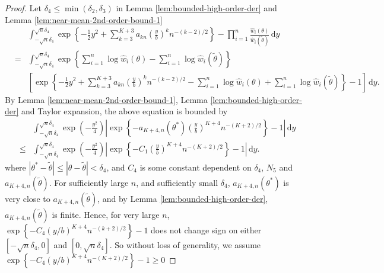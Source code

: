 \documentclass[oneside,english]{amsbook}
\numberwithin{section}{chapter}
\numberwithin{equation}{section}
\numberwithin{figure}{section}
\theoremstyle{plain}
\theoremstyle{plain}
\theoremstyle{definition}
\theoremstyle{plain}
\theoremstyle{plain}
\theoremstyle{remark}
\theoremstyle{definition}
\theoremstyle{definition}
\newcommand{\diff}{\,\mathrm{d}}
\begin{document}
\begin{proof}
Let $\delta_{4}\le\min\left(\delta_{2},\delta_{3}\right)$ in Lemma
\ref{lem:bounded-high-order-der} and Lemma \ref{lem:near-mean-2nd-order-bound-1}
\begin{eqnarray*}
 &  & \int_{-\sqrt{n}\delta_{4}}^{\sqrt{n}\delta_{4}}\exp\left\{ -\frac{1}{2}y^{2}+\sum_{k=3}^{K+3}a_{kn}\left(\frac{y}{b}\right)^{k}n^{-\left(k-2\right)/2}\right\} -\prod_{i=1}^{n}\frac{\hat{w}_{i}\left(\theta\right)}{\hat{w}_{i}\left(\tilde{\theta}\right)}\diff y\\
 & = & \int_{-\sqrt{n}\delta_{4}}^{\sqrt{n}\delta_{4}}\exp\left\{ \sum_{i=1}^{n}\log\hat{w}_{i}\left(\theta\right)-\sum_{i=1}^{n}\log\hat{w}_{i}\left(\tilde{\theta}\right)\right\} \\
 &  & \left[\exp\left\{ -\frac{1}{2}y^2+\sum_{k=3}^{K+3}a_{kn}\left(\frac{y}{b}\right)^{k}n^{-\left(k-2\right)/2}-\sum_{i=1}^{n}\log\hat{w}_{i}\left(\theta\right)+\sum_{i=1}^{n}\log\hat{w}_{i}\left(\tilde{\theta}\right)\right\} -1\right]\diff y.
\end{eqnarray*}
By %
Lemma \ref{lem:near-mean-2nd-order-bound-1}, %
Lemma \ref{lem:bounded-high-order-der} and Taylor expansion, the
above equation is bounded by 
\begin{eqnarray}
 &  & \int_{-\sqrt{n}\delta_{4}}^{\sqrt{n}\delta_{4}}\exp\left(-\frac{y^{2}}{4}\right)\left|\exp\left\{ -a_{K+4,n}\left(\theta^{*}\right)\left(\frac{y}{b}\right)^{K+4}n^{-\left(K+2\right)/2}\right\} -1\right|\diff y\nonumber \\
 & \le & \int_{-\sqrt{n}\delta_{4}}^{\sqrt{n}\delta_{4}}\exp\left(-\frac{y^{2}}{4}\right)\left|\exp\left\{ -C_{1}\left(\frac{y}{b}\right)^{K+4}n^{-\left(K+2\right)/2}\right\} -1\right|\diff y.\label{eq:bounded-central-int-likratio}
\end{eqnarray}
where $\left|\theta^{*}-\tilde{\theta}\right|\le\left|\theta-\tilde{\theta}\right|<\delta_{4}$,
and $C_{4}$ is some constant dependent on $\delta_{4}$, $N_{5}$
and $a_{K+4,n}\left(\tilde{\theta}\right)$. For sufficiently large
$n$, and sufficiently small $\delta_{4}$, $a_{K+4,n}\left(\theta^{*}\right)$
is very close to $a_{K+4,n}\left(\tilde{\theta}\right)$, and by %
Lemma \ref{lem:bounded-high-order-der}, $a_{K+4,n}\left(\tilde{\theta}\right)$
is finite. Hence, for very large $n$,  $\exp\left\{ -C_{4}\left(y/b\right)^{K+4}n^{-\left(k+2\right)/2}\right\} -1$
does not change sign on either $\left[-\sqrt{n}\delta_{4},0\right]$
and $\left[0,\sqrt{n}\delta_{4}\right]$. So without loss of generality,
we assume $\exp\left\{ -C_{4}\left(y/b\right)^{K+4}n^{-\left(K+2\right)/2}\right\} -1\ge0$

\end{proof}
\end{document}

